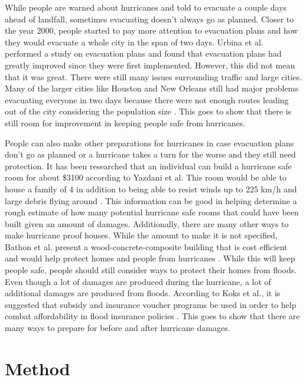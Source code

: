 While people are warned about hurricanes and told to evacuate a couple days ahead of landfall, sometimes evacuating doesn't always go as planned. Closer to the year 2000, people started to pay more attention to evacuation plans and how they would evacuate a whole city in the span of two days. Urbina et al. performed a study on evacuation plans and found that evacuation plans had greatly improved since they were first implemented. However, this did not mean that it was great. There were still many issues surrounding traffic and large cities. Many of the larger cities like Houston and New Orleans still had major problems evacuating everyone in two days because there were not enough routes leading out of the city considering the population size \cite{urbina2003national}. This goes to show that there is still room for improvement in keeping people safe from hurricanes. 

People can also make other preparations for hurricanes in case evacuation plans don't go as planned or a hurricane takes a turn for the worse and they still need protection. It has been researched that an individual can build a hurricane safe room for about \$3100 according to Yazdani et al. This room would be able to house a family of 4 in addition to being able to resist winds up to 225 km/h and large debris flying around \cite{yazdani2005hurricane}. This information can be good in helping determine  a rough estimate of how many potential hurricane safe rooms that could have been built given an amount of damages. Additionally, there are many other ways to make hurricane proof houses. While the amount to make it is not specified, Bathon et al. present a wood-concrete-composite building that is cost efficient and would help protect homes and people from hurricanes \cite{bathon2006hurricane}. While this will keep people safe, people should still consider ways to protect their homes from floods. Even though a lot of damages are produced during the hurricane, a lot of additional damages are produced from floods. According to Koks et al., it is suggested that subsidy and insurance voucher programs be used in order to help combat affordability in flood insurance policies \cite{koks2015combining}. This goes to show that there are many ways to prepare for before and after hurricane damages.

\section{Method}


